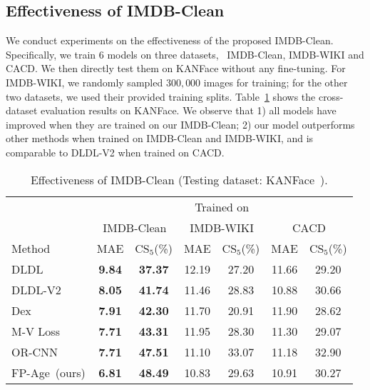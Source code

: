 \subsection{Effectiveness of IMDB-Clean}
We conduct experiments on the effectiveness of the proposed IMDB-Clean. Specifically, we train 6 models on three datasets, \ie~IMDB-Clean, IMDB-WIKI and CACD. We then directly test them on KANFace without any fine-tuning. For IMDB-WIKI, we randomly sampled $300,000$ images for training; for the other two datasets, we used their provided training splits.
Table~\ref{tab:imdb-clean-effectiveness} shows the cross-dataset evaluation results on KANFace. We observe that 1) all models have improved when they are trained on our IMDB-Clean; 2) our model outperforms other methods when trained on IMDB-Clean and IMDB-WIKI, and is comparable to DLDL-V2 when trained on CACD. 
\begin{table}[ht]
	\caption{Effectiveness of IMDB-Clean (Testing dataset: KANFace~\cite{georgopoulosInvestigatingBiasDeep2020}). }\label{tab:imdb-clean-effectiveness}
	\begin{center}
	\begin{threeparttable}
	\begin{adjustbox}{width=\columnwidth}
		\begin{tabular}{l|c|c|c|c|c|c}
    		\toprule
			 \multirow{2}{*}{}& \multicolumn{6}{c}{Trained on}  \\ 
			& \multicolumn{2}{c|}{IMDB-Clean} & \multicolumn{2}{c|}{IMDB-WIKI} & \multicolumn{2}{c}{CACD}
			\\ 
			\midrule \hline
            Method & MAE & CS$_5$(\%) & MAE & CS$_5$(\%) & MAE & CS$_5$(\%) 
            \\ 
            \hline 
			DLDL\cite{gaoDeepLabelDistribution2017}  & \textbf{9.84} &\textbf{37.37}   & 12.19 & 27.20 &11.66 &29.20  \\
			DLDL-V2\cite{gaoAgeEstimationUsing2018}   &\textbf{8.05} & \textbf{41.74} & 11.46 & 28.83 &10.88 & 30.66   \\
			Dex\cite{rotheDeepExpectationReal2018}   & \textbf{7.91} & \textbf{42.30} & 11.70 & 20.91 & 11.90 & 28.62   \\
			M-V Loss\cite{panMeanVarianceLossDeep2018}   & \textbf{7.71} & \textbf{43.31}& 11.95 & 28.30  & 11.30&   29.07 \\
			OR-CNN\cite{niuOrdinalRegressionMultiple2016}   & \textbf{7.71} & \textbf{47.51} & 11.10 & 33.07 & 11.18  & 32.90 \\
			\hline
			FP-Age~(ours)   & \textbf{6.81} & \textbf{48.49} & 10.83 & 29.63 & 10.91 &  30.27  \\
			\bottomrule
		\end{tabular}
		\end{adjustbox}
	\end{threeparttable}
	\end{center}
\end{table}

